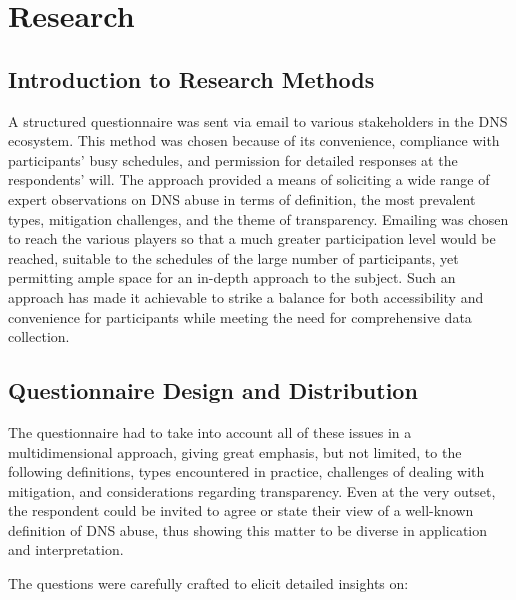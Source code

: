 \chapter{Research}

\section{Introduction to Research Methods} 

A structured questionnaire was sent via email to various stakeholders in the DNS ecosystem. This method was chosen because of its convenience, compliance with participants' busy schedules, and permission for detailed responses at the respondents' will. The approach provided a means of soliciting a wide range of expert observations on DNS abuse in terms of definition, the most prevalent types, mitigation challenges, and the theme of transparency. Emailing was chosen to reach the various players so that a much greater participation level would be reached, suitable to the schedules of the large number of participants, yet permitting ample space for an in-depth approach to the subject. Such an approach has made it achievable to strike a balance for both accessibility and convenience for participants while meeting the need for comprehensive data collection.



\section{Questionnaire Design and Distribution} 

The questionnaire had to take into account all of these issues in a multidimensional approach, giving great emphasis, but not limited, to the following definitions, types encountered in practice, challenges of dealing with mitigation, and considerations regarding transparency. Even at the very outset, the respondent could be invited to agree or state their view of a well-known definition of DNS abuse, thus showing this matter to be diverse in application and interpretation.

The questions were carefully crafted to elicit detailed insights on:

